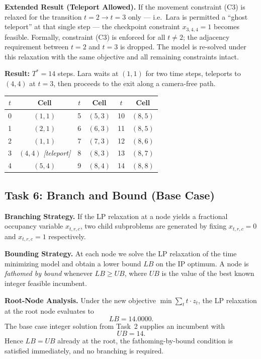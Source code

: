 \documentclass[12pt,a4paper]{article}
\begin{document}
\medskip
\textbf{Extended Result (Teleport Allowed).}
If the movement constraint (C3) is relaxed for the transition $t=2\to t=3$ only ---
i.e.\ Lara is permitted a ``ghost teleport'' at that single step --- the checkpoint
constraint $x_{3,4,4}=1$ becomes feasible. Formally, constraint (C3) is enforced for all
$t \neq 2$; the adjacency requirement between $t=2$ and $t=3$ is dropped. The model is
re-solved under this relaxation with the same objective and all remaining constraints
intact.

\textbf{Result: } $T^*=14$ steps. Lara waits at $(1,1)$ for two time steps, teleports to
$(4,4)$ at $t=3$, then proceeds to the exit along a camera-free path.

\begin{center}
\begin{tabular}{cc|cc|cc}
\toprule
$t$ & Cell & $t$ & Cell & $t$ & Cell \\
\midrule
 0 & $(1,1)$ &  5 & $(5,3)$ & 10 & $(8,5)$ \\
 1 & $(2,1)$ &  6 & $(6,3)$ & 11 & $(8,5)$ \\
 2 & $(1,1)$ &  7 & $(7,3)$ & 12 & $(8,6)$ \\
 3 & $(4,4)$ \textit{[teleport]} &  8 & $(8,3)$ & 13 & $(8,7)$ \\
 4 & $(5,4)$ &  9 & $(8,4)$ & 14 & $(8,8)$ \\
\bottomrule
\end{tabular}
\end{center}

\subsection*{Task 6: Branch and Bound (Base Case)}

\textbf{Branching Strategy.}
If the LP relaxation at a node yields a fractional occupancy variable $x_{t,r,c}$, two
child subproblems are generated by fixing $x_{t,r,c}=0$ and $x_{t,r,c}=1$ respectively.

\textbf{Bounding Strategy.}
At each node we solve the LP relaxation of the time minimizing model and obtain a lower
bound $LB$ on the IP optimum. A node is \emph{fathomed by bound} whenever $LB\geq UB$,
where $UB$ is the value of the best known integer feasible incumbent.

\textbf{Root-Node Analysis.}
Under the new objective $\min\sum_{t} t\cdot z_t$, the LP relaxation at the root node
evaluates to
\[
  LB = 14.0000.
\]
The base case integer solution from Task~2 supplies an incumbent with
\[
  UB = 14.
\]
Hence $LB = UB$ already at the root, the fathoming-by-bound condition is satisfied
immediately, and no branching is required.
\end{document}
